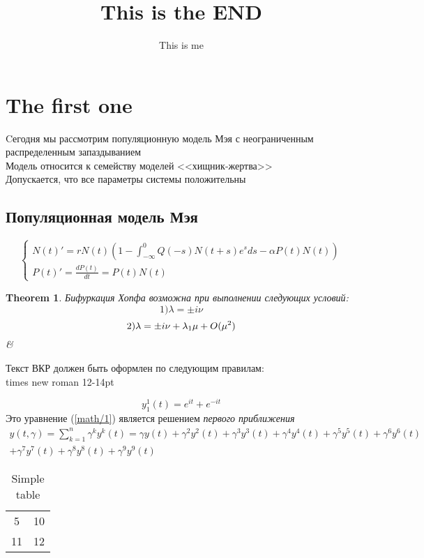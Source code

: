 \documentclass[12pt]{article}
\title{This is the END}
\author{This is me}
\begin{document}
\newtheorem{thmv}{Theorem}
\maketitle
\section{The first one}
Cегодня мы рассмотрим популяционную модель Мэя с неограниченным распределенным запаздыванием\\
Модель относится к семейству моделей <<хищник-жертва>>\\
Допускается, что все параметры системы положительны
\subsection{Популяционная модель Мэя}
\begin{equation*}
    \begin{cases}
    N(t)'=r N(t)(1-\int_{-\infty}^{0} Q(-s)N(t+s) e^s ds - \alpha P(t) N(t))\\ 
    P(t)'=\frac{d P(t)}{d t}= P(t)N(t)
\end{cases}
\end{equation*}
   \begin{thmv}
  Бифуркация Хопфа возможна при выполнении следующих условий:
    \[1)  \lambda=\pm i \nu \]
    \[2)  \lambda=\pm i \nu + \lambda \textsubscript{1} \mu + O(\mu \textsuperscript{2}) \]&\ 
     \end{thmv}
    \begin{center}
        Текст ВКР должен быть оформлен по следующим правилам:\\
        \Large times new roman 12-14pt
    \end{center}
\begin{equation}
\label{math/1}
    y_1^1 (t)=e^{it}+e^{-it}
\end{equation}
Это уравнение (\ref{math/1}) является решением \emph{ первого приближения }
  \begin{multline}
      y(t,\gamma)=\sum_{k=1}^n \gamma^k y^k (t)= \gamma y(t)+\gamma^2 y^2(t)+\gamma^3 y^3(t)+\gamma^4 y^4 (t)  + \gamma^5 y^5(t)+\gamma^6 y^6(t) \\+\gamma^7 y^7(t) +\gamma^8 y^8(t)+\gamma^9 y^9(t)
  \end{multline}
  \begin{table}
      \centering
      \begin{tabular}{ | c c |}
         \hline
           5 & 10 \\
          11 & 12 \\
          \hline
      \end{tabular}
      \caption{Simple table}
      \label{tab:my_label}
  \end{table}
   
\end{document}
